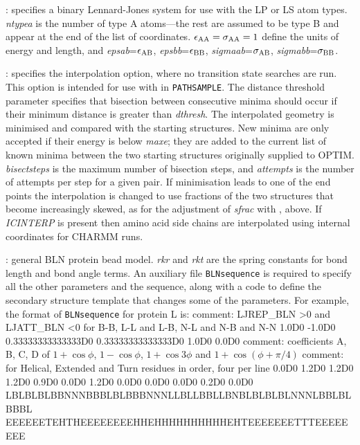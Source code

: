 {{: specifies a binary Lennard-Jones
system for use with the LP or LS atom types. {\it ntypea\/} is the number of type
A atoms---the rest are assumed to be type B and appear at the end of the list
of coordinates. $\epsilon_{\rm AA}=\sigma_{\rm AA}=1$ define the units of energy and length,
and {\it epsab\/}=$\epsilon_{\rm AB}$, {\it epsbb\/}=$\epsilon_{\rm BB}$,
{\it sigmaab\/}=$\sigma_{\rm AB}$, {\it sigmabb\/}=$\sigma_{\rm BB}$.

: specifies 
the {} interpolation option,
where no transition state searches are run. 
This option is intended for use with {} in {\tt PATHSAMPLE}.
The distance threshold parameter specifies that bisection between consecutive minima
should occur if their minimum distance is greater than {\it dthresh}.
The interpolated geometry is minimised and compared with the starting structures.
New minima are only accepted if their energy is below {\it maxe}; they are added to the
current list of known minima between the two starting structures originally supplied to OPTIM. 
{\it bisectsteps\/} is the maximum number of bisection steps, and
{\it attempts} is the number of attempts per step for a given pair.
If minimisation leads to one of the end points the interpolation is changed to use
fractions of the two structures that become increasingly skewed, as for
the adjustment of {\it sfrac\/} with {}, above.
If {\it ICINTERP\/} is present then amino acid side chains are interpolated using
internal coordinates for CHARMM runs.

: general BLN protein bead model.\cite{SorensonH00,BrownFH03}
{\it rkr} and {\it rkt} are the spring constants for bond length and bond angle terms.
An auxiliary file {\tt BLNsequence} is required to specify all the other parameters and
the sequence, along with a code to define the secondary structure template that changes
some of the parameters.
For example, the format of {\tt BLNsequence} for protein L is:
{\obeylines
comment: LJREP\_BLN >0  and LJATT\_BLN <0 for B-B, L-L and L-B, N-L and N-B and N-N
1.0D0 -1.0D0
0.33333333333333D0 0.33333333333333D0
1.0D0 0.0D0
comment: coefficients A, B, C, D of $1+\cos\phi$, $1-\cos\phi$, $1+\cos3\phi$ and $1+\cos(\phi +\pi/4)$
comment: for Helical, Extended and Turn residues in order, four per line
0.0D0 1.2D0 1.2D0 1.2D0
0.9D0 0.0D0 1.2D0 0.0D0
0.0D0 0.0D0 0.2D0 0.0D0
LBLBLBLBBNNNBBBLBLBBBNNNLLBLLBBLLBNBLBLBLBLNNNLBBLBLBBBL
EEEEEETEHTHEEEEEEEEHHEHHHHHHHHHHEHTEEEEEEETTTEEEEEEEE
}

}}
